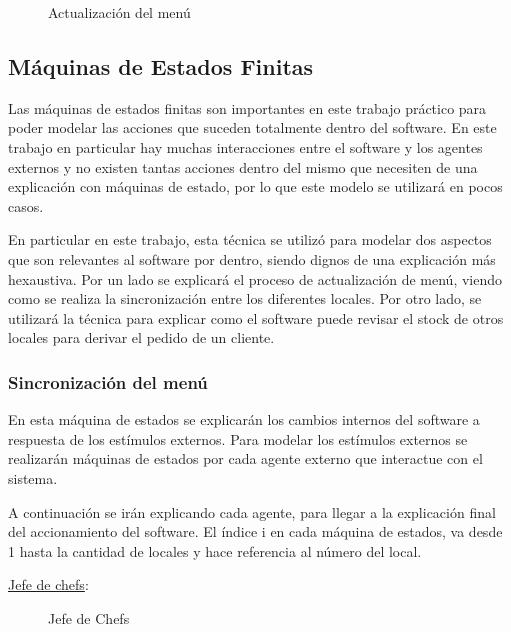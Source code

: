 \documentclass[a4paper,10pt]{article}
\begin{document}
\begin{figure}[H]
\centering
{}
\caption{Actualizaci\'on del men\'u}
\end{figure}


\bigskip

\subsection*{M\'aquinas de Estados Finitas}

Las m\'aquinas de estados finitas son importantes en este trabajo pr\'actico para poder modelar las acciones que suceden totalmente dentro del software. En este trabajo en particular hay muchas interacciones entre el software y los agentes externos y no existen tantas acciones dentro del mismo que necesiten de una explicaci\'on con m\'aquinas de estado, por lo que este modelo se utilizar\'a en pocos casos. 

En particular en este trabajo, esta t\'ecnica se utiliz\'o para modelar dos aspectos que son relevantes al software por dentro, siendo dignos de una explicaci\'on m\'as hexaustiva. Por un lado se explicar\'a el proceso de actualizaci\'on de men\'u, viendo como se realiza la sincronizaci\'on entre los diferentes locales. Por otro lado, se utilizar\'a la t\'ecnica para explicar como el software puede revisar el stock de otros locales para derivar el pedido de un cliente.


\subsubsection*{Sincronizaci\'on del men\'u}

En esta m\'aquina de estados se explicar\'an los cambios internos del software a respuesta de los est\'imulos externos. Para modelar los est\'imulos externos se realizar\'an m\'aquinas de estados por cada agente externo que interactue con el sistema.

A continuaci\'on se ir\'an explicando cada agente, para llegar a la explicaci\'on final del accionamiento del software.
El \'indice i en cada m\'aquina de estados, va desde 1 hasta la cantidad de locales y hace referencia al n\'umero del local.

\noindent \underline{Jefe de chefs}:

\begin{figure}[H]
\centering
{}
\caption{Jefe de Chefs}
\end{figure}
\end{document}
